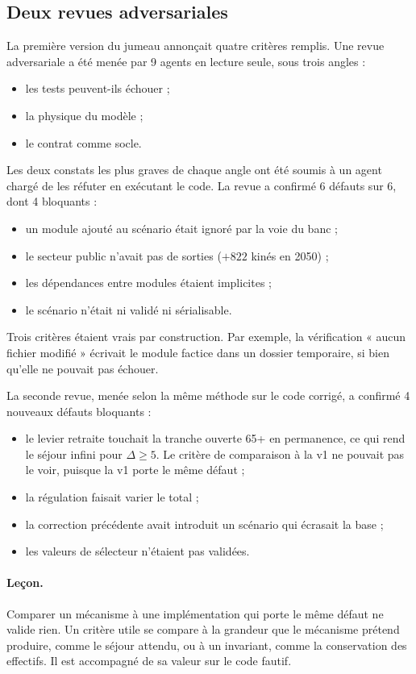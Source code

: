\documentclass[11pt]{article}
\begin{document}
\subsection{Deux revues adversariales}
La première version du jumeau annonçait quatre critères remplis. Une revue adversariale a été menée
par 9 agents en lecture seule, sous trois angles :
\begin{itemize}
  \item les tests peuvent-ils échouer ;
  \item la physique du modèle ;
  \item le contrat comme socle.
\end{itemize}
Les deux constats les plus graves de chaque angle ont été soumis à un agent chargé de les réfuter
en exécutant le code. La revue a confirmé 6\mesure{} défauts sur 6, dont 4 bloquants :
\begin{itemize}
  \item un module ajouté au scénario était ignoré par la voie du banc ;
  \item le secteur public n'avait pas de sorties ($+822$\mesure{} kinés en 2050) ;
  \item les dépendances entre modules étaient implicites ;
  \item le scénario n'était ni validé ni sérialisable.
\end{itemize}
Trois critères étaient vrais par construction. Par exemple, la vérification « aucun fichier
modifié » écrivait le module factice dans un dossier temporaire, si bien qu'elle ne pouvait pas
échouer.

La seconde revue, menée selon la même méthode sur le code corrigé, a confirmé 4\mesure{} nouveaux
défauts bloquants :
\begin{itemize}
  \item le levier retraite touchait la tranche ouverte 65+ en permanence, ce qui rend le séjour
        infini pour $\Delta \ge 5$. Le critère de comparaison à la v1 ne pouvait pas le voir, puisque
        la v1 porte le même défaut ;
  \item la régulation faisait varier le total ;
  \item la correction précédente avait introduit un scénario qui écrasait la base ;
  \item les valeurs de sélecteur n'étaient pas validées.
\end{itemize}

\paragraph{Leçon.} Comparer un mécanisme à une implémentation qui porte le même défaut ne valide
rien. Un critère utile se compare à la grandeur que le mécanisme prétend produire, comme le séjour
attendu, ou à un invariant, comme la conservation des effectifs. Il est accompagné de sa valeur sur
le code fautif.
\end{document}
